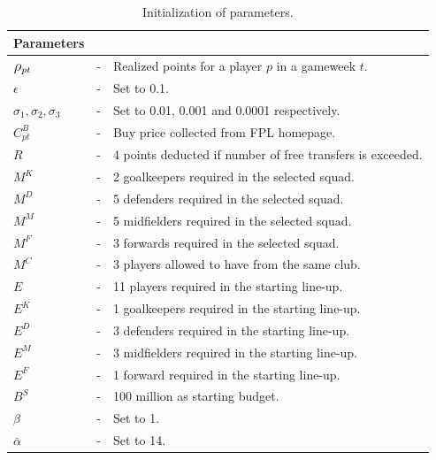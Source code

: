 \begin{table}[H] 
\tabcolsep=0.11cm
\centering
\caption{Initialization of parameters.}
\begin{tabular}{@{}lll@{}}
\toprule
Parameters                       &   &                                                                                                \\ \midrule
$\mathlarger{\rho_{pt}}$ & - & Realized points for a player $p$ in a gameweek $t$. \\
$\epsilon$                       & - & Set to 0.1.                                                                     \\
$\sigma_{1}, \sigma_{2}, \sigma_{3} $                     & - & Set to 0.01, 0.001 and 0.0001 respectively.                                               \\
$C_{pt}^{B}$                     & - & Buy price collected from FPL homepage.  \\ 
$R$                              & - & 4 points deducted if number of free transfers is exceeded.       \\
$M^{K}$                          & - &  2 goalkeepers required in the selected squad.                                      \\
$M^{D}$                          & - &  5 defenders required in the selected squad.                         \\
$M^{M}$                          & - & 5 midfielders required in the selected squad.                                     \\
$M^{F}$                          & - & 3 forwards required in the selected squad.                                    \\
$M^{C}$                          & - & 3 players allowed to have from the same club.                                \\
$E$                              & - & 11 players required in the starting line-up.                              \\
$E^{K}$                          & - & 1 goalkeepers required in the starting line-up.                                       \\
$E^{D}$                          & - & 3 defenders required in the starting line-up.                  \\
$E^{M}$                          & - & 3 midfielders required in the starting line-up.                                 \\
$E^{F}$                          & - & 1 forward required in the starting line-up.                     \\
$B^{S}$                          & - & 100 million as starting budget.                                                                              \\
$\beta$                          & - & Set to 1.                                                                                  \\          
$\bar{\alpha}$                   & - & Set to 14.                                                                      \\


\end{tabular}
\end{table}
